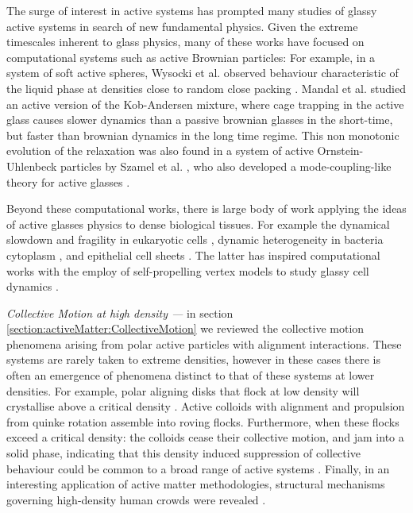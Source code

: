 The surge of interest in active systems has prompted many studies of glassy active systems in search of new fundamental physics. Given the extreme timescales inherent to glass physics, many of these works have focused on  computational systems such as active Brownian particles:
 For example, in a system of soft active spheres, Wysocki et al. observed behaviour characteristic of the liquid phase at densities close to random close packing \cite{wysocki2014}.
Mandal et al. \cite{mandal2020,mandal2021} studied an active version of the Kob-Andersen mixture, where cage trapping in the active glass causes slower dynamics than a passive brownian glasses in the short-time, but faster than brownian dynamics in the long time regime. This non monotonic evolution of the relaxation was also found in a system of active Ornstein-Uhlenbeck particles by Szamel et al. \cite{szamel2015}, who also developed a mode-coupling-like theory for active glasses \cite{szamel2015,szamel2016}. 


Beyond these computational works, there is large body of work applying the ideas of active glasses physics to dense biological tissues. For example the dynamical slowdown and fragility in eukaryotic cells \cite{zhou2009}, dynamic heterogeneity in bacteria cytoplasm \cite{parry2014}, and epithelial cell sheets \cite{angelini2011}. The latter has inspired computational works with the employ of self-propelling vertex models to study glassy cell dynamics \cite{bi2016,bi2015}.


\textit{Collective Motion at high density ---} in section \ref{section:activeMatter:CollectiveMotion} we reviewed the collective motion phenomena arising from polar active particles with alignment interactions. These systems are rarely taken to extreme densities, however in these cases there is often an emergence of phenomena distinct to that of these systems at lower densities. For example, polar aligning disks that flock at low density will crystallise above a critical density \cite{briand2018a}. 
Active colloids with alignment and propulsion from quinke rotation assemble into roving flocks. Furthermore, when these flocks exceed a critical density: the colloids cease their collective motion, and jam into a solid phase, indicating that this density induced suppression of collective behaviour could be common to a broad range of active systems \cite{geyer2019}. Finally, in an interesting application of active matter methodologies, structural mechanisms governing high-density human crowds were revealed \cite{bottinelli2016}.


